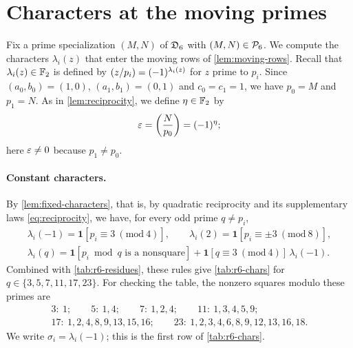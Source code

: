 \section{Characters at the moving primes}\label{sec:r6-characters}

Fix a prime specialization $(M,N)$ of $\mathfrak D_6$ with $(M,N)\in\mathcal P_6$. We compute the characters $\lambda_i(z)$ that enter the moving rows of \cref{lem:moving-rows}. Recall that $\lambda_i(z)\in\mathbb F_2$ is defined by $\leg{z}{p_i}=(-1)^{\lambda_i(z)}$ for $z$ prime to $p_i$. Since $(a_0,b_0)=(1,0)$, $(a_1,b_1)=(0,1)$ and $c_0=c_1=1$, we have $p_0=M$ and $p_1=N$. As in \cref{lem:reciprocity}, we define $\eta\in\mathbb F_2$ by
\[
\eps=\leg{N}{p_0}=(-1)^\eta;
\]
here $\varepsilon\ne0$ because $p_1\ne p_0$.

\paragraph{Constant characters.} By \cref{lem:fixed-characters}, that is, by quadratic reciprocity and its supplementary laws \eqref{eq:reciprocity}, we have, for every odd prime $q\ne p_i$,
\begin{equation}\label{r6:const-rule}
\begin{gathered}
\lambda_i(-1)=\mathbf 1[p_i\equiv3\ (\mathrm{mod}\ 4)],\qquad \lambda_i(2)=\mathbf 1[p_i\equiv\pm3\ (\mathrm{mod}\ 8)],\\
\lambda_i(q)=\mathbf 1[p_i\bmod q\text{ is a nonsquare}]+\mathbf 1[q\equiv3\ (\mathrm{mod}\ 4)]\,\lambda_i(-1).
\end{gathered}
\end{equation}
Combined with \cref{tab:r6-residues}, these rules give \cref{tab:r6-chars} for $q\in\{3,5,7,11,17,23\}$. For checking the table, the nonzero squares modulo these primes are
\[
\begin{gathered}
3:\ 1;\qquad 5:\ 1,4;\qquad 7:\ 1,2,4;\qquad 11:\ 1,3,4,5,9;\\
17:\ 1,2,4,8,9,13,15,16;\qquad 23:\ 1,2,3,4,6,8,9,12,13,16,18.
\end{gathered}
\]
We write $\sigma_i=\lambda_i(-1)$; this is the first row of \cref{tab:r6-chars}.

